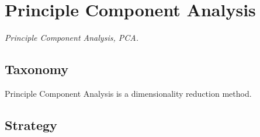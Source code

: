 

\section{Principle Component Analysis} 
\label{sec:pca}


\emph{Principle Component Analysis, PCA.}

\subsection{Taxonomy}
Principle Component Analysis is a dimensionality reduction method.

\subsection{Strategy}



